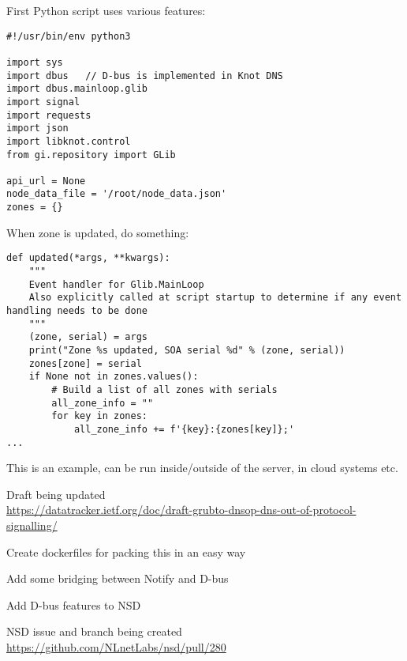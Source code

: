 \documentclass[Screen16to9,17pt]{foils}
\begin{document}

First Python script uses various features:
\begin{verbatim}
#!/usr/bin/env python3

import sys
import dbus   // D-bus is implemented in Knot DNS
import dbus.mainloop.glib
import signal
import requests
import json
import libknot.control
from gi.repository import GLib

api_url = None
node_data_file = '/root/node_data.json'
zones = {}
\end{verbatim}



When zone is updated, do something:
\begin{verbatim}
def updated(*args, **kwargs):
    """
    Event handler for Glib.MainLoop
    Also explicitly called at script startup to determine if any event handling needs to be done
    """
    (zone, serial) = args
    print("Zone %s updated, SOA serial %d" % (zone, serial))
    zones[zone] = serial
    if None not in zones.values():
        # Build a list of all zones with serials
        all_zone_info = ""
        for key in zones:
            all_zone_info += f'{key}:{zones[key]};'
...
\end{verbatim}

This is an example, can be run inside/outside of the server, in cloud systems etc.





\begin{list2}
\item Draft being updated \\
\url{https://datatracker.ietf.org/doc/draft-grubto-dnsop-dns-out-of-protocol-signalling/}
\item Create dockerfiles for packing this in an easy way
\item Add some bridging between Notify and D-bus
\item Add D-bus features to NSD
\item NSD issue and branch being created \url{https://github.com/NLnetLabs/nsd/pull/280}
\end{list2}
\end{document}
